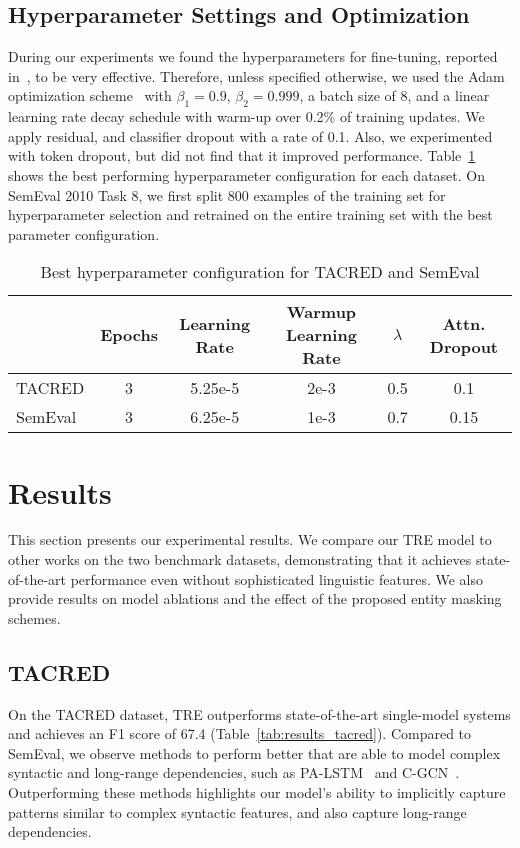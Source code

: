 \documentclass[akbc,twoside,11pt]{article}
\begin{document}
\subsection{Hyperparameter Settings and Optimization}
\label{subsec:exp_hyperparams}
During our experiments we found the hyperparameters for fine-tuning, reported in~\cite{radford_improvinglu_2018}, to be very effective. Therefore, unless specified otherwise, we used the Adam optimization scheme~\cite{adam_2015} with $\beta_1=0.9$, $\beta_2=0.999$, a batch size of 8, and a linear learning rate decay schedule with warm-up over 0.2\% of training updates. We apply residual, and classifier dropout with a rate of 0.1. Also, we experimented with token dropout, but did not find that it improved performance. Table~\ref{tab:best_hyperparameters} shows the best performing hyperparameter configuration for each dataset. On SemEval 2010 Task 8, we first split 800 examples of the training set for hyperparameter selection and retrained on the entire training set with the best parameter configuration.

\begin{table}[ht!]
    \centering
    \begin{tabular}{l c c c c c} \\\hline
        & Epochs & Learning Rate & Warmup Learning Rate & $\lambda$ & Attn. Dropout  \\\hline
        TACRED & 3 & 5.25e-5 & 2e-3 & 0.5 & 0.1 \\
        SemEval & 3 & 6.25e-5 & 1e-3 & 0.7 & 0.15 \\
        \hline
    \end{tabular}
    \caption{Best hyperparameter configuration for TACRED and SemEval}
    \label{tab:best_hyperparameters}
\end{table}

\section{Results}
\label{sec:results}
This section presents our experimental results. We compare our TRE model to other works on the two benchmark datasets, demonstrating that it achieves state-of-the-art performance even without sophisticated linguistic features. We also provide results on model ablations and the effect of the proposed entity masking schemes.


\subsection{TACRED}
On the TACRED dataset, TRE outperforms state-of-the-art single-model systems and achieves an F1 score of 67.4 (Table~\ref{tab:results_tacred}). Compared to SemEval, we observe methods to perform better that are able to model complex syntactic and long-range dependencies, such as PA-LSTM~\cite{zhang_position_aware_2017} and C-GCN~\cite{zhang_graphco_2018}. Outperforming these methods highlights our model's ability to implicitly capture patterns similar to complex syntactic features, and also capture long-range dependencies.
\end{document}
